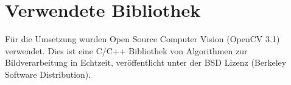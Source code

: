 \section{Verwendete Bibliothek}
\label{Libary}
Für die Umsetzung wurden Open Source Computer Vision (OpenCV 3.1) verwendet. Dies ist eine C/C++ Bibliothek von Algorithmen zur Bildverarbeitung in Echtzeit, veröffentlicht unter der BSD Lizenz (Berkeley
Software Distribution). \cite{OpenCv_What_Is}\cite{wiki_Wha_is_OPenCV}
